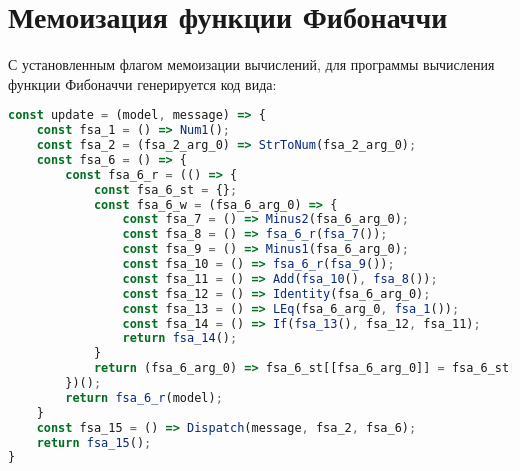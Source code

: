 \section{Мемоизация функции Фибоначчи}\label{sec:ch4/sect4}

С установленным флагом мемоизации вычислений, для программы вычисления функции Фибоначчи
генерируется код вида:

\begin{lstlisting}[language=JavaScript]
const update = (model, message) => {
    const fsa_1 = () => Num1();
    const fsa_2 = (fsa_2_arg_0) => StrToNum(fsa_2_arg_0);
    const fsa_6 = () => {
        const fsa_6_r = (() => {
            const fsa_6_st = {};
            const fsa_6_w = (fsa_6_arg_0) => {
                const fsa_7 = () => Minus2(fsa_6_arg_0);
                const fsa_8 = () => fsa_6_r(fsa_7());
                const fsa_9 = () => Minus1(fsa_6_arg_0);
                const fsa_10 = () => fsa_6_r(fsa_9());
                const fsa_11 = () => Add(fsa_10(), fsa_8());
                const fsa_12 = () => Identity(fsa_6_arg_0);
                const fsa_13 = () => LEq(fsa_6_arg_0, fsa_1());
                const fsa_14 = () => If(fsa_13(), fsa_12, fsa_11);
                return fsa_14();
            }
            return (fsa_6_arg_0) => fsa_6_st[[fsa_6_arg_0]] = fsa_6_st[[fsa_6_arg_0]] || fsa_6_w(fsa_6_arg_0);
        })();
        return fsa_6_r(model);
    }
    const fsa_15 = () => Dispatch(message, fsa_2, fsa_6);
    return fsa_15();
}
\end{lstlisting}

\clearpage
